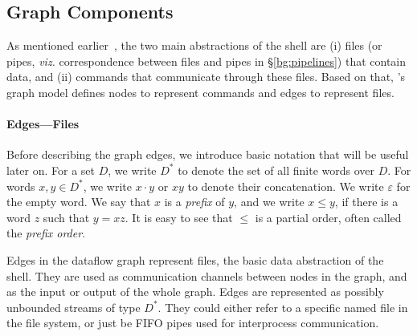 \documentclass[letterpaper,twocolumn,10pt]{article}
\newcommand{\TODO}[1]{\hl{\textbf{TODO:} #1}\xspace}
\newcommand{\kstar}{^{\textstyle *}}
\newcommand{\eps}{\varepsilon}
\begin{document}
\subsection{Graph Components}
\label{graph-components}

As mentioned earlier~, the two main abstractions of
the shell are (i) files (or pipes, \emph{viz.} correspondence between
files and pipes in \S\ref{bg:pipelines}) that contain data, and (ii)
commands that communicate through these files. Based on that, \sys's
graph model defines nodes to represent commands and edges to represent
files.

\paragraph{Edges---Files}

Before describing the graph edges, we introduce basic notation that
will be useful later on.  For a set $D$, we write $D\kstar$ to denote
the set of all finite words over $D$. For words $x, y \in D\kstar$, we
write $x \cdot y$ or $xy$ to denote their concatenation. We write
$\eps$ for the empty word. We say that $x$ is a \emph{prefix} of $y$,
and we write $x \leq y$, if there is a word $z$ such that $y = xz$. It
is easy to see that $\leq$ is a partial order, often called the
\emph{prefix order}.

Edges in the dataflow graph represent files, the basic data
abstraction of the shell. They are used as communication channels
between nodes in the graph, and as the input or output of the whole
graph. Edges are represented as possibly unbounded streams of type
$D\kstar$. They could either refer to a specific named file in the file
system, or just be FIFO pipes used for interprocess communication.


\end{document}
